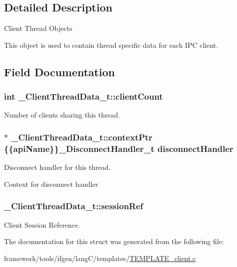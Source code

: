 \subsection{Detailed Description}
Client Thread Objects

This object is used to contain thread specific data for each I\+PC client. 

\subsection{Field Documentation}
\subsubsection[{\texorpdfstring{client\+Count}{clientCount}}]{\setlength{\rightskip}{0pt plus 5cm}int \+\_\+\+Client\+Thread\+Data\+\_\+t\+::client\+Count}\hypertarget{struct___client_thread_data__t_ae71f7d2dc077580e08c02d0367292bb4}{}\label{struct___client_thread_data__t_ae71f7d2dc077580e08c02d0367292bb4}


Number of clients sharing this thread. 

\subsubsection[{\texorpdfstring{context\+Ptr}{contextPtr}}]{$\ast$ \+\_\+\+Client\+Thread\+Data\+\_\+t\+::context\+Ptr \{\{{\bf api\+Name}\}\}\+\_\+\+Disconnect\+Handler\+\_\+t disconnect\+Handler}\hypertarget{struct___client_thread_data__t_abd0819c42000fb09fa96bdcd69b8e2e7}{}\label{struct___client_thread_data__t_abd0819c42000fb09fa96bdcd69b8e2e7}


Disconnect handler for this thread. 

Context for disconnect handler 
\subsubsection[{\texorpdfstring{session\+Ref}{sessionRef}}]{ \+\_\+\+Client\+Thread\+Data\+\_\+t\+::session\+Ref}\hypertarget{struct___client_thread_data__t_a8ddf83e8f01adeb51e31004a7077c602}{}\label{struct___client_thread_data__t_a8ddf83e8f01adeb51e31004a7077c602}


Client Session Reference. 



The documentation for this struct was generated from the following file\+:\begin{DoxyCompactItemize}
\item 
framework/tools/ifgen/lang\+C/templates/\hyperlink{_t_e_m_p_l_a_t_e__client_8c}{T\+E\+M\+P\+L\+A\+T\+E\+\_\+client.\+c}\end{DoxyCompactItemize}
